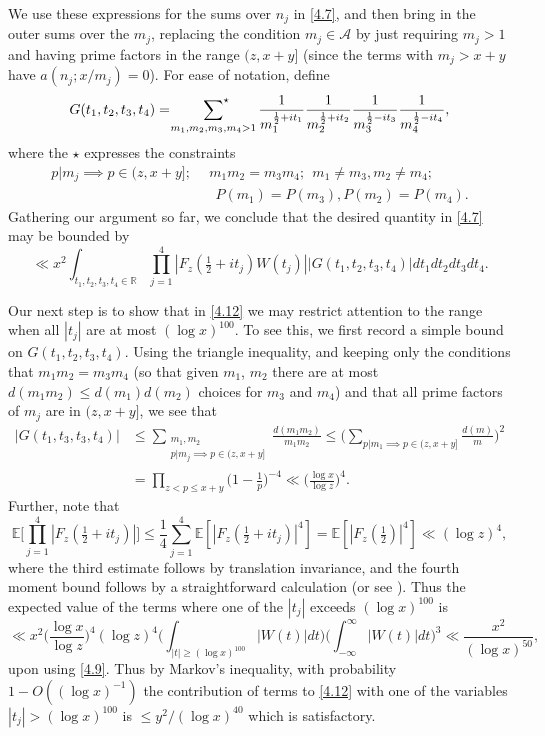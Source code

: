 \documentclass[12pt, notitlepage]{amsart}
\numberwithin{equation}{section}
\def\E{\mathbb E}
\def\rsum{\sideset{_{} ^{}} {_{} ^{\star}}{\sum }}
\theoremstyle{remark}
\theoremstyle{definition}
\theoremstyle{remark}
\numberwithin{equation}{section}
\begin{document}
We use these expressions for the sums over $n_j$ in \eqref{4.7}, and then bring in the outer sums over the $m_j$, replacing the condition $m_j \in {\mathcal A}$ 
by just requiring $m_j >1$ and having prime factors in the range $(z,x+y]$ (since the terms with $m_j>x+y$ have $a(n_j;x/m_j) = 0$).  For ease of notation, define 
\begin{equation} 
\label{4.10} 
G(t_1, t_2, t_3, t_4) = \rsum_{m_1, m_2, m_3, m_4 > 1} \frac{1}{m_1^{\frac 12+it_1}} \frac{1}{m_2^{\frac 12+it_2}} \frac{1}{m_3^{\frac 12-it_3}}\frac{1}{m_4^{\frac 12-it_4}}, 
\end{equation} 
where the $\star$ expresses the constraints 
\begin{align} 
\label{4.11} 
p|m_j \implies p\in (z,x+y]; \ \ &m_1 m_2 =m_3m_4; \ \ m_1 \neq m_3, m_2 \neq m_4; \nonumber\\
&\ \ P(m_1) = P(m_3), P(m_2)=P(m_4). 
\end{align}
Gathering our argument so far, we conclude that the desired quantity in \eqref{4.7} may be bounded by 
\begin{equation} 
\label{4.12} 
\ll x^2 \int_{t_1, t_2, t_3, t_4 \in {\mathbb R}} \prod_{j=1}^{4} |F_z(\tfrac 12+it_j) W(t_j)| |G(t_1,t_2,t_3,t_4)| dt_1 dt_2 dt_3 dt_4. 
\end{equation} 

\vspace{12pt}
Our next step is to show that in \eqref{4.12} we may restrict attention to the range when all $|t_j|$ are at most $(\log x)^{100}$.  To see this, we first record a simple bound on $G(t_1,t_2,t_3,t_4)$.  Using the triangle inequality, and keeping only the conditions that $m_1m_2 =m_3 m_4$ (so that given $m_1$, $m_2$ there are at most $d(m_1 m_2) \le d(m_1)d(m_2)$ choices for $m_3$ and $m_4$) and that all prime factors of $m_j$ are in $(z,x+y]$,  we see that 
\begin{align*}
|G(t_1, t_3, t_3, t_4)| &\le \sum_{\substack{m_1, m_2 \\ p|m_j \implies p\in (z,x+y]}} \frac{d(m_1 m_2)}{m_1 m_2} \le \Big( \sum_{p|m_1 \implies p\in (z,x+y]} \frac{d(m)}{m}\Big)^2 \\
&= \prod_{z < p \le x+y} \Big(1-\frac 1p\Big)^{-4} \ll \Big(\frac{\log x}{\log z} \Big)^4. 
\end{align*}
Further, note that 
$$ 
\E\Big[ \prod_{j=1}^{4} |F_z(\tfrac 12+it_j)|\Big] \le \frac 14 \sum_{j=1}^{4} \E[ |F_z(\tfrac 12+it_j)|^4] = \E[ |F_z(\tfrac 12)|^4] \ll (\log z)^4, 
$$
where the third estimate follows by translation invariance, and the fourth moment bound follows by a straightforward calculation (or see \cite[Euler Product Result 1]{Harperlargevalue}).
Thus the expected value of the terms where one of the $|t_j|$ exceeds $(\log x)^{100}$ is 
$$ 
\ll x^2 \Big(\frac{\log x}{\log z}\Big)^4 (\log z)^4 \Big( \int_{|t| \ge (\log x)^{100}} |W(t)| dt \Big) \Big( \int_{-\infty}^{\infty} |W(t)| dt \Big)^3 \ll 
\frac{x^2}{(\log x)^{50}}, 
$$ 
upon using \eqref{4.9}.   Thus by Markov's inequality, with probability $1-O((\log x)^{-1})$ the contribution of terms to \eqref{4.12} with one of the variables $|t_j| > (\log x)^{100}$ is $\le y^2/(\log x)^{40}$ which is satisfactory.  
\end{document}
